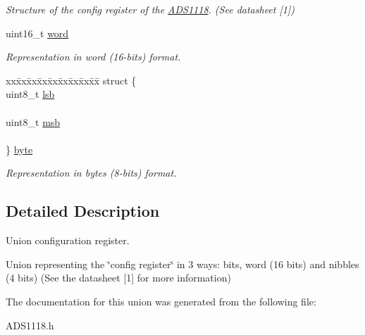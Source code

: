 \begin{DoxyCompactItemize}
\begin{tabbing}
\end{tabbing}\begin{DoxyCompactList}\small\item\em Structure of the config register of the \mbox{\hyperlink{class_a_d_s1118}{A\+D\+S1118}}. (See datasheet \mbox{[}1\mbox{]}) \end{DoxyCompactList}\item 
\mbox{\label{union_config_a5f72e077843f5c9e51cdeb6ef2510df9}} 
uint16\+\_\+t \mbox{\hyperlink{union_config_a5f72e077843f5c9e51cdeb6ef2510df9}{word}}
\begin{DoxyCompactList}\small\item\em Representation in word (16-\/bits) format. \end{DoxyCompactList}\item 
\mbox{\label{union_config_a35780eea5f07b69335bdfd7754eb12f1}} 
\begin{tabbing}
xx\=xx\=xx\=xx\=xx\=xx\=xx\=xx\=xx\=\kill
struct \{\\
\>uint8\_t \mbox{\hyperlink{union_config_a39309b66a0f5c8ccd880c13f0fff6b71}{lsb}}\\
\>\\
\>uint8\_t \mbox{\hyperlink{union_config_a8ac34c174b84a90b17260847ddf749d7}{msb}}\\
\>\\
\} \mbox{\hyperlink{union_config_a35780eea5f07b69335bdfd7754eb12f1}{byte}}\\

\end{tabbing}\begin{DoxyCompactList}\small\item\em Representation in bytes (8-\/bits) format. \end{DoxyCompactList}\end{DoxyCompactItemize}


\subsection{Detailed Description}
Union configuration register. 

Union representing the \char`\"{}config register\char`\"{} in 3 ways\+: bits, word (16 bits) and nibbles (4 bits) (See the datasheet \mbox{[}1\mbox{]} for more information) 

The documentation for this union was generated from the following file\+:\begin{DoxyCompactItemize}
\item 
A\+D\+S1118.\+h\end{DoxyCompactItemize}
